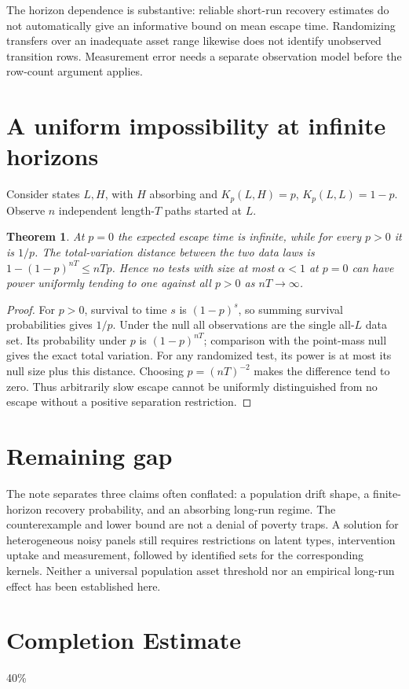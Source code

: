 \documentclass[11pt]{article}
\newtheorem{theorem}{Theorem}
\theoremstyle{definition}
\begin{document}
The horizon dependence is substantive: reliable short-run recovery estimates
do not automatically give an informative bound on mean escape time.
Randomizing transfers over an inadequate asset range likewise does not
identify unobserved transition rows. Measurement error needs a separate
observation model before the row-count argument applies.

\section*{A uniform impossibility at infinite horizons}
Consider states $L,H$, with $H$ absorbing and
$K_p(L,H)=p$, $K_p(L,L)=1-p$. Observe $n$ independent length-$T$ paths
started at $L$.
\begin{theorem}
At $p=0$ the expected escape time is infinite, while for every $p>0$ it is
$1/p$. The total-variation distance between the two data laws is
$1-(1-p)^{nT}\le nTp$. Hence no tests with size at most $\alpha<1$ at
$p=0$ can have power uniformly tending to one against all $p>0$ as
$nT\to\infty$.
\end{theorem}
\begin{proof}
For $p>0$, survival to time $s$ is $(1-p)^s$, so summing survival
probabilities gives $1/p$. Under the null all observations are the single
all-$L$ data set. Its probability under $p$ is $(1-p)^{nT}$; comparison
with the point-mass null gives the exact total variation. For any randomized
test, its power is at most its null size plus this distance. Choosing
$p=(nT)^{-2}$ makes the difference tend to zero. Thus arbitrarily slow
escape cannot be uniformly distinguished from no escape without a positive
separation restriction.
\end{proof}

\section*{Remaining gap}
The note separates three claims often conflated: a population drift shape,
a finite-horizon recovery probability, and an absorbing long-run regime.
The counterexample and lower bound are not a denial of poverty traps.
A solution for heterogeneous noisy panels still requires restrictions on
latent types, intervention uptake and measurement, followed by identified
sets for the corresponding kernels. Neither a universal population asset
threshold nor an empirical long-run effect has been established here.

\section{Completion Estimate}
40\%
\end{document}
